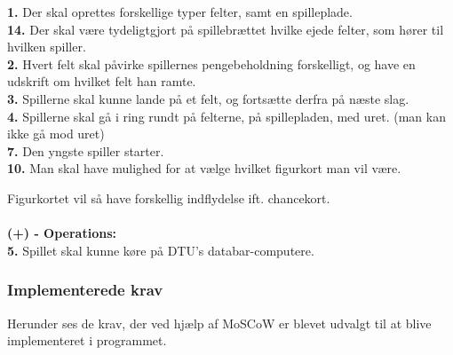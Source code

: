     \textbf{1.} Der skal oprettes forskellige typer felter, samt en spilleplade. \\
    \textbf{14.} Der skal være tydeligtgjort på spillebrættet hvilke ejede felter, som hører til hvilken spiller. \\
    \textbf{2.} Hvert felt skal påvirke spillernes pengebeholdning forskelligt, og have en udskrift om hvilket felt han ramte. \\
    \textbf{3.} Spillerne skal kunne lande på et felt, og fortsætte derfra på næste slag. \\
    \textbf{4.} Spillerne skal gå i ring rundt på felterne, på spillepladen, med uret. (man kan ikke gå mod uret) \\
    \textbf{7.} Den yngste spiller starter. \\
    \textbf{10.} Man skal have mulighed for at vælge hvilket figurkort man vil være.
    
    Figurkortet vil så have forskellig indflydelse ift. chancekort.
\\\\\textbf{(+) - Operations:}\\
    \textbf{5.} Spillet skal kunne køre på DTU’s databar-computere. \\

    \pagebreak
\subsubsection{Implementerede krav}

Herunder ses de krav, der ved hjælp af MoSCoW er blevet udvalgt til at blive implementeret i programmet. \\


